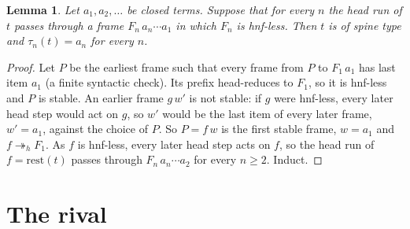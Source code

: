 \documentclass[11pt]{amsart}
\newtheorem{lemma}[theorem]{Lemma}
\theoremstyle{definition}
\newcommand{\hred}{\twoheadrightarrow_h}
\newcommand{\rest}{\mathrm{rest}}
\begin{document}
\begin{lemma}\label{lem:spine}
Let $a_1,a_2,\dots$ be closed terms. Suppose that for every $n$ the head run of $t$ passes through a
frame $F_n\,a_n\cdots a_1$ in which $F_n$ is hnf-less. Then $t$ is of spine type and $\tau_n(t)=a_n$ for
every $n$.
\end{lemma}

\begin{proof}
Let $P$ be the earliest frame such that every frame from $P$ to $F_1\,a_1$ has last item $a_1$ (a finite
syntactic check). Its prefix head-reduces to $F_1$, so it is hnf-less and $P$ is stable. An earlier
frame $g\,w'$ is not stable: if $g$ were hnf-less, every later head step would act on $g$, so $w'$ would
be the last item of every later frame, $w'=a_1$, against the choice of $P$. So $P=f\,w$ is the first
stable frame, $w=a_1$ and $f\hred F_1$. As $f$ is hnf-less, every later head step acts on $f$, so the
head run of $f=\rest(t)$ passes through $F_n\,a_n\cdots a_2$ for every $n\ge2$. Induct.
\end{proof}

\section{The rival}\label{sec:rival}
\end{document}
